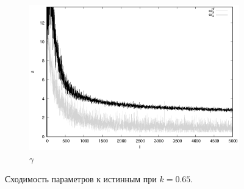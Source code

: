 \documentclass[tikz,10pt,a4paper]{article}
\begin{document}
\begin{figure}[h]
\begin{subfigure}[b]{0.35\textwidth}
    \includegraphics[width=\textwidth]{figs/levmar/comparison/comparison_5000_1000_xsigma0.65_float.txt_parameter3.eps}
	\caption{$\gamma$}
  \end{subfigure}
  \caption{Сходимость параметров к истинным при $k = 0.65$.}
  \label{fig:comparison_0.65}
\end{figure}
\end{document}

